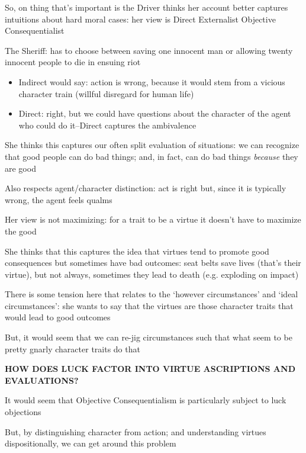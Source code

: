 \documentclass[11pt]{article}
\begin{document}
\noindent So, on thing that's important is the Driver thinks her account better captures intuitions about hard moral cases: her view is Direct Externalist Objective Consequentialist
\vspace*{2mm}

\noindent The Sheriff: has to choose between saving one innocent man or allowing twenty innocent people to die in ensuing riot

\begin{itemize}\item{Indirect would say: action is wrong, because it would stem from a vicious character train (willful disregard for human life)}\item{Direct: right, but we could have questions about the character of the agent who could do it--Direct captures the ambivalence}\end{itemize}

\noindent She thinks this captures our often split evaluation of situations: we can recognize that good people can do bad things; and, in fact, can do bad things \emph{because} they are good
\vspace*{2mm}

\noindent Also respects agent/character distinction: act is right but, since it is typically wrong, the agent feels qualms
\vspace*{2mm}

\noindent Her view is not maximizing: for a trait to be a virtue it doesn't have to maximize the good
\vspace*{2mm}

\noindent She thinks that this captures the idea that virtues tend to promote good consequences but sometimes have bad outcomes: seat belts save lives (that's their virtue), but not always, sometimes they lead to death (e.g. exploding on impact)
\vspace*{2mm}

\noindent There is some tension here that relates to the `however circumstances' and `ideal circumstances': she wants to say that the virtues are those character traits that would lead to good outcomes
\vspace*{2mm}

\noindent But, it would seem that we can re-jig circumstances such that what seem to be pretty gnarly character traits do that
\vspace*{2mm}

\noindent \textbf{HOW DOES LUCK FACTOR INTO VIRTUE ASCRIPTIONS AND EVALUATIONS?}
\vspace*{2mm}

\noindent It would seem that Objective Consequentialism is particularly subject to luck objections
\vspace*{2mm}

\noindent But, by distinguishing character from action; and understanding virtues dispositionally, we can get around this problem
\end{document}
